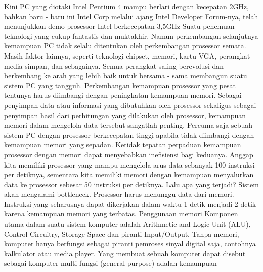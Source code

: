Kini PC yang diotaki Intel Pentium 4 mampu berlari dengan kecepatan 2GHz, bahkan baru - baru ini Intel Corp melalui ajang Intel Developer Forum-nya, telah menunjukkan demo prosessor Intel berkecepatan 3,5GHz Suatu penemuan teknologi yang cukup fantastis dan muktakhir. Namun perkembangan selanjutnya kemampuan PC tidak selalu ditentukan oleh perkembangan prosessor semata.
Masih faktor lainnya, seperti teknologi chipset, memori, kartu VGA, perangkat media simpan, dan sebagainya. Semua perangkat saling berevolusi dan berkembang ke arah yang lebih baik untuk bersama - sama membangun suatu sistem PC yang tangguh. Perkembangan kemampuan prosessor yang pesat tentunya harus diimbangi dengan peningkatan kemampuan memori. Sebagai penyimpan data atau informasi yang dibutuhkan oleh prosessor sekaligus sebagai penyimpan hasil dari perhitungan yang dilakukan oleh prosessor, kemampuan memori dalam mengelola data tersebut sangatlah penting.
Percuma saja sebuah sistem PC dengan prosessor berkecepatan tinggi apabila tidak diimbangi dengan kemampuan memori yang sepadan. Ketidak tepatan perpaduan kemampuan prosessor dengan memori dapat menyebabkan inefisiensi bagi keduanya. Anggap kita memiliki prosessor yang mampu mengelola arus data sebanyak 100 instruksi per detiknya, sementara kita memiliki memori dengan kemampuan menyalurkan data ke prosessor sebesar 50 instruksi per detiknya. Lalu apa yang terjadi? Sistem akan mengalami bottleneck. Prosessor harus menunggu data dari memori.
Instruksi yang seharusnya dapat dikerjakan dalam waktu 1 detik menjadi 2 detik karena kemampuan memori yang terbatas.
Penggunaan memori
Komponen utama dalam suatu sistem komputer adalah Arithmetic and Logic Unit (ALU), Control Circuitry, Storage Space dan piranti Input/Output. Tanpa memori, komputer hanya berfungsi sebagai piranti pemroses sinyal digital saja, contohnya kalkulator atau media player. Yang membuat sebuah komputer dapat disebut sebagai komputer multi-fungsi (general-purpose)  adalah kemampuan 